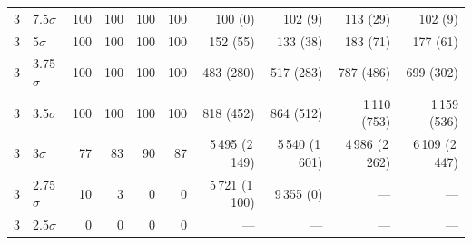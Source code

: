 \begin{tabular}{@{}llrrrrrrrr@{}}
3 & 7.5$\sigma$ & 100 & 100 & 100 & 100 & 100 (0) & 102 (9) & 113 (29) & 102 (9)\\
3 & 5$\sigma$ & 100 & 100 & 100 & 100 & 152 (55) & 133 (38) & 183 (71) & 177 (61)\\
3 & 3.75$\sigma$ & 100 & 100 & 100 & 100 & 483 (280) & 517 (283) & 787 (486) & 699 (302)\\
3 & 3.5$\sigma$ & 100 & 100 & 100 & 100 & 818 (452) & 864 (512) & 1\,110 (753) & 1\,159 (536)\\
3 & 3$\sigma$ & 77 & 83 & 90 & 87 & 5\,495 (2\,149) & 5\,540 (1\,601) & 4\,986 (2\,262) & 6\,109 (2\,447)\\
3 & 2.75$\sigma$ & 10 & 3 & 0 & 0 & 5\,721 (1\,100) & 9\,355 (0) & --- & ---\\
3 & 2.5$\sigma$ & 0 & 0 & 0 & 0 & --- & --- & --- & ---\\
\bottomrule
\end{tabular}
